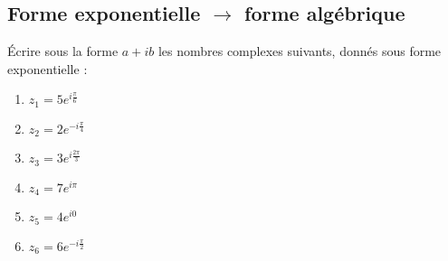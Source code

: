 \subsection{Forme exponentielle $\rightarrow$ forme algébrique}

Écrire sous la forme $a+ib$ les nombres complexes suivants, donnés sous forme exponentielle :
\begin{multicols}{2}
\begin{enumerate}
    \item $z_1 = 5 e^{i \frac{\pi}{6}}$
    \item $z_2 = 2 e^{-i \frac{\pi}{4}}$
    \item $z_3 = 3 e^{i \frac{2\pi}{3}}$
    \item $z_4 = 7 e^{i \pi}$
    \item $z_5 = 4 e^{i 0}$
    \item $z_6 = 6 e^{-i \frac{\pi}{2}}$
\end{enumerate}
\end{multicols}

\vspace{2em}

